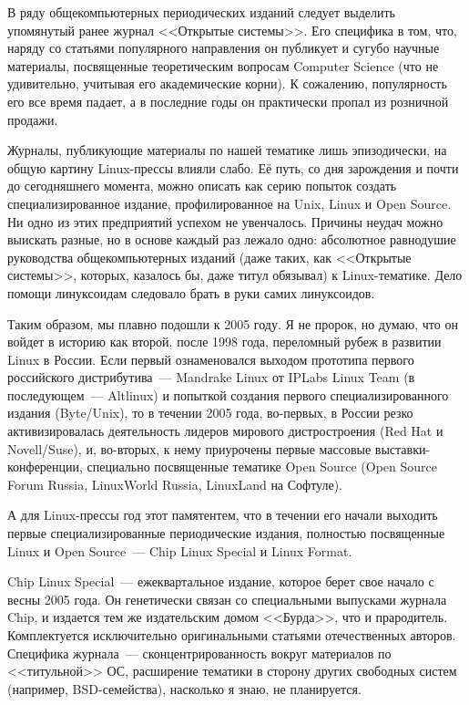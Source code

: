 В ряду общекомпьютерных периодических изданий следует выделить упомянутый ранее журнал <<Открытые системы>>. Его специфика в том, что, наряду со статьями популярного направления он публикует и сугубо научные материалы, посвященные теоретическим вопросам Computer Science (что не удивительно, учитывая его академические корни). К сожалению, популярность его все время падает, а в последние годы он практически пропал из розничной продажи.

Журналы, публикующие материалы по нашей тематике лишь эпизодически, на общую картину Linux-прессы влияли слабо. Её путь, со дня зарождения и почти до сегодняшнего момента, можно описать как серию попыток создать специализированное издание, профилированное на Unix, Linux и Open Source. Ни одно из этих предприятий успехом не увенчалось. Причины неудач можно выискать разные, но в основе каждый раз лежало одно: абсолютное равнодушие руководства общекомпьютерных изданий (даже таких, как <<Открытые системы>>, которых, казалось бы, даже титул обязывал) к Linux-тематике. Дело помощи линуксоидам следовало брать в руки самих линуксоидов.

Таким образом, мы плавно подошли к 2005 году. Я не пророк, но думаю, что он войдет в историю как второй, после 1998 года, переломный рубеж в развитии Linux в России. Если первый ознаменовался выходом прототипа первого российского дистрибутива~--- Mandrake Linux от IPLabs Linux Team (в последующем~--- Altlinux) и попыткой создания первого специализированного издания (Byte/Unix), то в течении 2005 года, во-первых, в России резко активизировалась деятельность лидеров мирового дистростроения (Red Hat и Novell/Suse), и, во-вторых, к нему приурочены первые массовые выставки-конференции, специально посвященные тематике Open Source (Open Source Forum Russia, LinuxWorld Russia, LinuxLand на Софтуле).

А для Linux-прессы год этот памятентем, что в течении его начали выходить первые специализированные периодические издания, полностью посвященные Linux и Open Source~--- Chip Linux Special и Linux Format.

Chip Linux Special~--- ежеквартальное издание, которое берет свое начало с весны 2005 года. Он генетически связан со специальными выпусками журнала Chip, и издается тем же издательским домом <<Бурда>>, что и прародитель. Комплектуется исключительно оригинальными статьями отечественных авторов. Специфика журнала~--- сконцентрированность вокруг материалов по <<титульной>> ОС, расширение тематики в сторону других свободных систем (например, BSD-семейства), насколько я знаю, не планируется.

